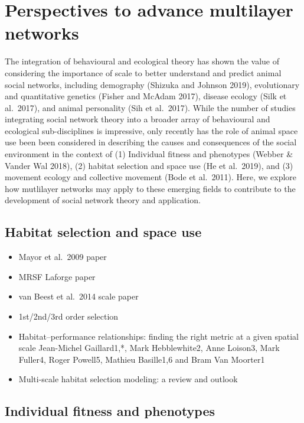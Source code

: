 \documentclass[]{article}
\providecommand{\tightlist}{%
  \setlength{\itemsep}{0pt}\setlength{\parskip}{0pt}}
\begin{document}
\hypertarget{perspectives-to-advance-multilayer-networks}{%
\section{Perspectives to advance multilayer networks}\label{perspectives-to-advance-multilayer-networks}}

The integration of behavioural and ecological theory has shown the value of considering the importance of scale to better understand and predict animal social networks, including demography (Shizuka and Johnson 2019), evolutionary and quantitative genetics (Fisher and McAdam 2017), disease ecology (Silk et al.~2017), and animal personality (Sih et al.~2017). While the number of studies integrating social network theory into a broader array of behavioural and ecological sub-disciplines is impressive, only recently has the role of animal space use been been considered in describing the causes and consequences of the social environment in the context of (1) Individual fitness and phenotypes (Webber \& Vander Wal 2018), (2) habitat selection and space use (He et al.~2019), and (3) movement ecology and collective movement (Bode et al.~2011). Here, we explore how mutlilayer networks may apply to these emerging fields to contribute to the development of social network theory and application.

\hypertarget{habitat-selection-and-space-use}{%
\subsection{Habitat selection and space use}\label{habitat-selection-and-space-use}}

\begin{itemize}
\tightlist
\item
  Mayor et al.~2009 paper
\item
  MRSF Laforge paper
\item
  van Beest et al.~2014 scale paper
\item
  1st/2nd/3rd order selection
\item
  Habitat--performance relationships: finding the right metric at a given spatial scale Jean-Michel Gaillard1,*, Mark Hebblewhite2, Anne Loison3, Mark Fuller4, Roger Powell5, Mathieu Basille1,6 and Bram Van Moorter1
\item
  Multi-scale habitat selection modeling: a review and outlook
\end{itemize}

\hypertarget{individual-fitness-and-phenotypes}{%
\subsection{Individual fitness and phenotypes}\label{individual-fitness-and-phenotypes}}
\end{document}
